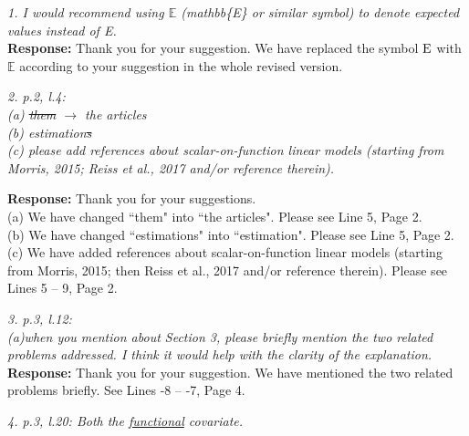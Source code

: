 \documentclass[12pt]{report}
\begin{document}
\begin{description}


\item \textcolor[rgb]{0.00,0.50,1.00}{\em 1. I would recommend using $\mathbb{E}$ (mathbb\{{\rm{E}}\} or similar symbol) to denote expected values instead
of {\rm E}. } \\

{ \bf Response: } Thank you for your suggestion. We have replaced the symbol ${\rm E}$ with $\mathbb{E}$ according to your suggestion in the whole revised version.


\item {{ \textcolor[rgb]{0.00,0.50,1.00}{\em 2. p.2, l.4:\\
(a) \sout{them} $\rightarrow$ the articles\\
(b) estimation\sout{s}\\
(c) please add references about scalar-on-function linear models (starting from Morris, 2015;
Reiss et al., 2017 and/or reference therein).\\
 }}}

{ \bf Response: } Thank you for your suggestions.\\

(a) We have changed ``them" into ``the articles". Please see Line 5, Page 2.\\

(b) We have changed ``estimations" into ``estimation". Please see Line 5, Page 2.\\

(c) We have added references about scalar-on-function linear models (starting from Morris, 2015; then Reiss et al., 2017 and/or reference therein). Please see Lines 5 -- 9, Page 2.\\


\item {{ \textcolor[rgb]{0.00,0.50,1.00}{\em 3. p.3, l.12:\\
(a)when you mention about Section 3, please briefly mention the two related problems
addressed. I think it would help with the clarity of the explanation. }}}\\

{ \bf Response: } Thank you for your suggestion. We have mentioned the two related problems briefly. See Lines -8 -- -7, Page 4. \\

\item {{ \textcolor[rgb]{0.00,0.50,1.00}{\em 4. p.3, l.20: Both the \uline{functional} covariate. }}}\\


\end{description}
\end{document}
